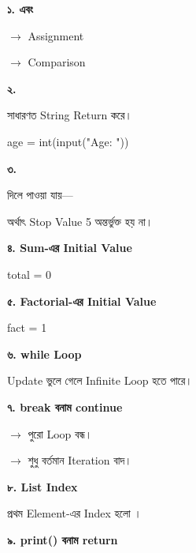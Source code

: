 \begin{trapbox}

\textbf{\color{deepOrange}১. \py{=} এবং \py{==}}

\py{=}
\(\rightarrow\)
Assignment

\py{==}
\(\rightarrow\)
Comparison

\medskip

\textbf{\color{deepOrange}২. }

 সাধারণত String Return করে।

\begin{english}
\ttfamily
age = int(input("Age: "))
\end{english}

\medskip

\textbf{\color{deepOrange}৩. }

 দিলে পাওয়া যায়—


অর্থাৎ Stop Value 5 অন্তর্ভুক্ত হয় না।

\medskip

\textbf{\color{deepOrange}৪. Sum-এর Initial Value}

\begin{english}
\ttfamily
total = 0
\end{english}

\medskip

\textbf{\color{deepOrange}৫. Factorial-এর Initial Value}

\begin{english}
\ttfamily
fact = 1
\end{english}

\medskip

\textbf{\color{deepOrange}৬. while Loop}

Update ভুলে গেলে Infinite Loop হতে পারে।

\medskip

\textbf{\color{deepOrange}৭. break বনাম continue}

\(\rightarrow\)
পুরো Loop বন্ধ।

\(\rightarrow\)
শুধু বর্তমান Iteration বাদ।

\medskip

\textbf{\color{deepOrange}৮. List Index}

প্রথম Element-এর Index হলো ।

\medskip

\textbf{\color{deepOrange}৯. print() বনাম return}


\end{trapbox}
